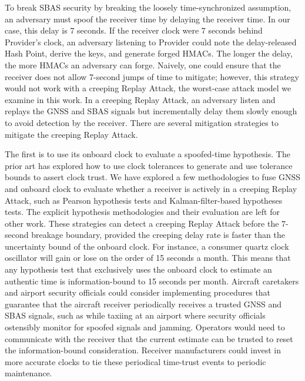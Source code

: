 \documentclass[letterpaper,times]{IONconf/IONconf}
\begin{document}
	To break SBAS security by breaking the loosely time-synchronized assumption, an adversary must spoof the receiver time by delaying the receiver time.
	In our case, this delay is 7 seconds.
	If the receiver clock were 7 seconds behind Provider's clock, an adversary listening to Provider could note the delay-released Hash Point, derive the keys, and generate forged HMACs.
	The longer the delay, the more HMACs an adversary can forge.
	Naively, one could ensure that the receiver does not allow 7-second jumps of time to mitigate; however, this strategy would not work with a creeping Replay Attack, the worst-case attack model we examine in this work.
	In a creeping Replay Attack, an adversary listen and replays the GNSS and SBAS signals but incrementally delay them slowly enough to avoid detection by the receiver.
	There are several mitigation strategies to mitigate the creeping Replay Attack.

	The first is to use its onboard clock to evaluate a spoofed-time hypothesis.
	The prior art has explored how to use clock tolerances to generate and use tolerance bounds to assert clock trust\cite{time_sync_paper}.
	We have explored a few methodologies to fuse GNSS and onboard clock to evaluate whether a receiver is actively in a creeping Replay Attack, such as Pearson hypothesis tests and Kalman-filter-based hypotheses tests.
	The explicit hypothesis methodologies and their evaluation are left for other work.
	These strategies can detect a creeping Replay Attack before the 7-second breakage boundary, provided the creeping delay rate is faster than the uncertainty bound of the onboard clock.
	For instance, a consumer quartz clock oscillator will gain or lose on the order of 15 seconds a month.
	This means that any hypothesis test that exclusively uses the onboard clock to estimate an authentic time is information-bound to 15 seconds per month.
	Aircraft caretakers and airport security officials could consider implementing procedures that guarantee that the aircraft receiver periodically receives a trusted GNSS and SBAS signals, such as while taxiing at an airport where security officials ostensibly monitor for spoofed signals and jamming.
	Operators would need to communicate with the receiver that the current estimate can be trusted to reset the information-bound consideration.
	Receiver manufacturers could invest in more accurate clocks to tie these periodical time-trust events to periodic maintenance.
\end{document}
